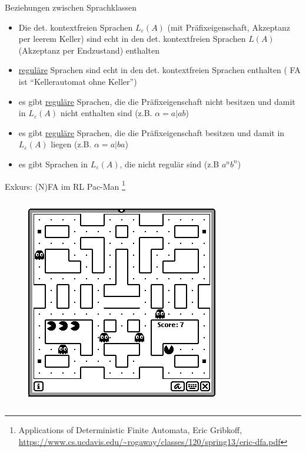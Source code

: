 \begin{frame}{Beziehungen zwischen Sprachklassen}
	\begin{itemize}
		\item Die det. kontextfreien Sprachen $L_\varepsilon(A)$ (mit Präfixeigenschaft, Akzeptanz per leerem Keller) sind echt in den det. kontextfreien Sprachen $L(A)$ (Akzeptanz per Endzustand) enthalten
		\item \underline{reguläre} Sprachen sind echt in den det. kontextfreien	Sprachen enthalten ( FA ist "`Kellerautomat ohne Keller"')
		\item es gibt \underline{reguläre} Sprachen, die die Präfixeigenschaft nicht besitzen und damit in $L_\varepsilon(A)$ nicht enthalten sind (z.B. $\alpha=a|ab$)
		\item es gibt \underline{reguläre} Sprachen, die die Präfixeigenschaft besitzen und damit in $L_\varepsilon(A)$ liegen (z.B. $\alpha=a|ba$)
		\item es gibt Sprachen in $L_\varepsilon(A)$, die nicht regulär sind (z.B ${a^nb^n}$)
	\end{itemize}
\end{frame}

\begin{frame}{Exkurs: (N)FA im RL}
Pac-Man \footnote{Applications of Deterministic Finite Automata, Eric Gribkoff, \url{https://www.cs.ucdavis.edu/~rogaway/classes/120/spring13/eric-dfa.pdf}}
		\begin{columns}
		\begin{figure}
			\includegraphics[width=0.6\linewidth]{images/Pac-Man}
		\end{figure}
	\end{columns}
\end{frame}


